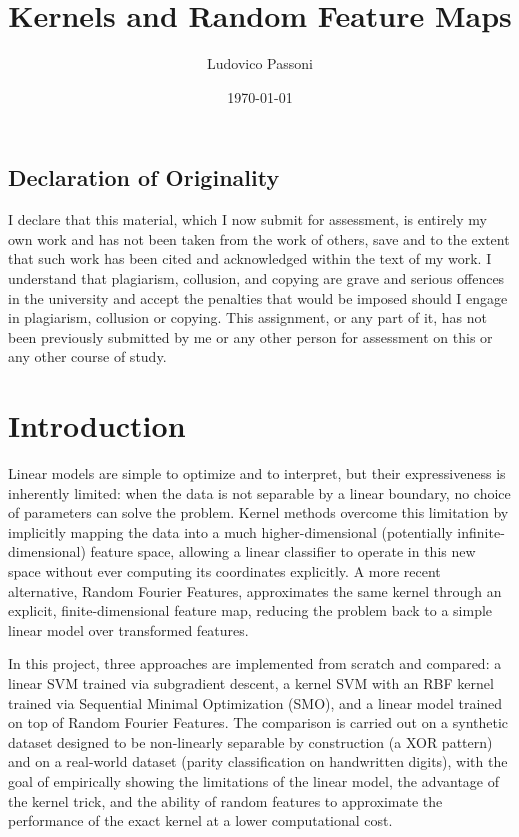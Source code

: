 \documentclass{article}
\begin{document}
\title{Kernels and Random Feature Maps}
\author{Ludovico Passoni}
\date{\today}
\maketitle
\begin{center}
\subsection*{Declaration of Originality}

I declare that this material, which I now submit for assessment, is entirely my own work and
has not been taken from the work of others, save and to the extent that such work has been
cited and acknowledged within the text of my work. I understand that plagiarism, collusion,
and copying are grave and serious offences in the university and accept the penalties that
would be imposed should I engage in plagiarism, collusion or copying. This assignment, or
any part of it, has not been previously submitted by me or any other person for assessment
on this or any other course of study.
\end{center}
\section{Introduction}

Linear models are simple to optimize and to interpret, but their expressiveness is inherently limited: when the data is not separable by a linear boundary, no choice of parameters can solve the problem. Kernel methods overcome this limitation by implicitly mapping the data into a much higher-dimensional (potentially infinite-dimensional) feature space, allowing a linear classifier to operate in this new space without ever computing its coordinates explicitly. A more recent alternative, Random Fourier Features, approximates the same kernel through an explicit, finite-dimensional feature map, reducing the problem back to a simple linear model over transformed features.

In this project, three approaches are implemented from scratch and compared: a linear SVM trained via subgradient descent, a kernel SVM with an RBF kernel trained via Sequential Minimal Optimization (SMO), and a linear model trained on top of Random Fourier Features. The comparison is carried out on a synthetic dataset designed to be non-linearly separable by construction (a XOR pattern) and on a real-world dataset (parity classification on handwritten digits), with the goal of empirically showing the limitations of the linear model, the advantage of the kernel trick, and the ability of random features to approximate the performance of the exact kernel at a lower computational cost.
\end{document}

